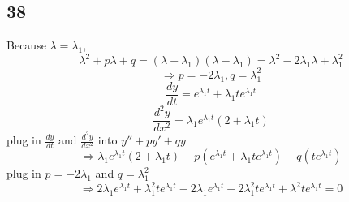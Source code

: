 \documentclass[12pt, a4paper]{IEEEtran}
\begin{document}
    \subsection*{38}
    Because $\lambda=\lambda_1$,\\
    $$\lambda^2+p\lambda+q=(\lambda-\lambda_1)(\lambda-\lambda_1)=\lambda^2-2\lambda_1\lambda+\lambda_1^2$$
    $$\Rightarrow p=-2\lambda_1, q=\lambda_1^2$$
    $$\frac{dy}{dt}=e^{\lambda_{1}t}+\lambda_1te^{\lambda_1t}$$
    $$\frac{d^2y}{dx^2}=\lambda_1e^{\lambda_1t}(2+\lambda_1t)$$
    plug in $\frac{dy}{dt}$ and $\frac{d^2y}{dx^2}$ into $y''+py'+qy$
    $$\Rightarrow \lambda_1e^{\lambda_1t}(2+\lambda_1t)+p(e^{\lambda_{1}t}+\lambda_1te^{\lambda_1t})-q(te^{\lambda_1t})$$
    plug in $p=-2\lambda_1$ and $ q=\lambda_1^2$
    $$\Rightarrow 2\lambda_1e^{\lambda_1t}+\lambda_1^2te^{\lambda_1t}-2\lambda_1e^{\lambda_1t}-2\lambda_1^2te^{\lambda_1t}+\lambda^2te^{\lambda_1t}=0$$
    

























    

    
\end{document}
